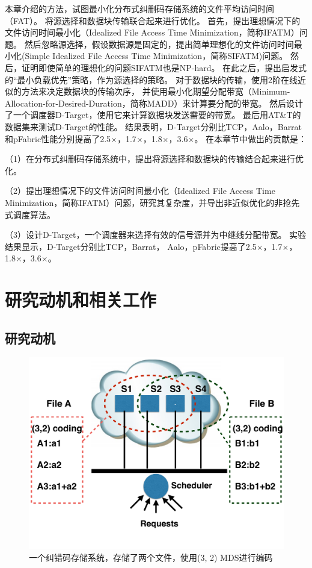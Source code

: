 本章介绍的方法，试图最小化分布式纠删码存储系统的文件平均访问时间（FAT）。
将源选择和数据块传输联合起来进行优化。
首先，提出理想情况下的文件访问时间最小化（Idealized File Access Time Minimization，简称IFATM）问题。
然后忽略源选择，假设数据源是固定的，提出简单理想化的文件访问时间最小化(Simple Idealized File Access Time Minimization，简称SIFATM)问题。
然后，证明即使简单的理想化的问题SIFATM也是NP-hard。
在此之后，提出启发式的“最小负载优先”策略，作为源选择的策略。
对于数据块的传输，使用2阶在线近似的方法来决定数据块的传输次序，
并使用最小化期望分配带宽（Minimum-Allocation-for-Desired-Duration，简称MADD）来计算要分配的带宽。
然后设计了一个调度器D-Target，使用它来计算数据块发送需要的带宽。
最后用AT\&T的数据集来测试D-Target的性能。
结果表明，D-Target分别比TCP，Aalo\cite{chowdhury2015efficient}，Barrat\cite{dogar2014decentralized}和pFabric\cite{pFabric}性能分别提高了2.5$\times$，1.7$\times$，1.8$\times$，3.6$\times$。
在本章节中做出的贡献是：

（1）在分布式纠删码存储系统中，提出将源选择和数据块的传输结合起来进行优化。

（2）提出理想情况下的文件访问时间最小化（Idealized File Access Time Minimization，简称IFATM）问题，研究其复杂度，并导出非近似优化的非抢先式调度算法。

（3）设计D-Target，一个调度器来选择有效的信号源并为中继线分配带宽。
实验结果显示，D-Target分别比TCP，Barrat\cite{dogar2014decentralized}，
Aalo\cite{chowdhury2015efficient}，pFabric\cite{pFabric}提高了2.5$\times$，1.7$\times$，1.8$\times$，3.6$\times$。


\section{研究动机和相关工作}
\label{erasure_coding:motivation}

\subsection{研究动机}
\begin{figure}[b]
\begin{center}
\includegraphics [width=0.8\columnwidth] {figures/DTARGET/picture/motivation/motivation.pdf}
\caption{一个纠错码存储系统，存储了两个文件，使用(3, 2) MDS进行编码}
\label{erasure-motivation-fig}
\end{center}
\end{figure}


